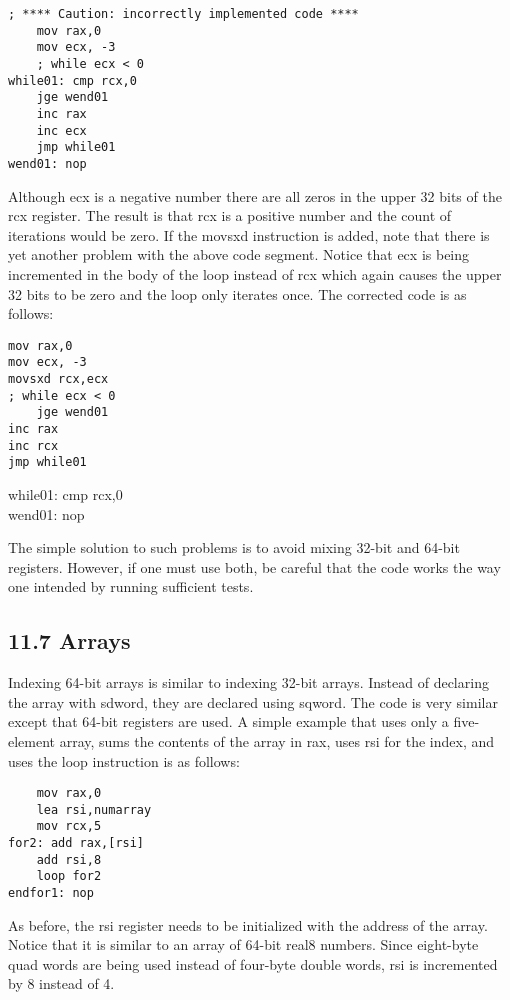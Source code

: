 \documentclass[10pt]{article}
\begin{document}
\begin{verbatim}
; **** Caution: incorrectly implemented code ****
    mov rax,0
    mov ecx, -3
    ; while ecx < 0
while01: cmp rcx,0
    jge wend01
    inc rax
    inc ecx
    jmp while01
wend01: nop
\end{verbatim}

Although ecx is a negative number there are all zeros in the upper 32 bits of the rcx register. The result is that rcx is a positive number and the count of iterations would be zero. If the movsxd instruction is added, note that there is yet another problem with the above code segment. Notice that ecx is being incremented in the body of the loop instead of rcx which again causes the upper 32 bits to be zero and the loop only iterates once. The corrected code is as follows:

\begin{verbatim}
mov rax,0
mov ecx, -3
movsxd rcx,ecx
; while ecx < 0
    jge wend01
inc rax
inc rcx
jmp while01
\end{verbatim}

while01: cmp rcx,0\\
wend01: nop

The simple solution to such problems is to avoid mixing 32-bit and 64-bit registers. However, if one must use both, be careful that the code works the way one intended by running sufficient tests.

\subsection*{11.7 Arrays}
Indexing 64-bit arrays is similar to indexing 32-bit arrays. Instead of declaring the array with sdword, they are declared using sqword. The code is very similar except that 64-bit registers are used. A simple example that uses only a five-element array, sums the contents of the array in rax, uses rsi for the index, and uses the loop instruction is as follows:

\begin{verbatim}
    mov rax,0
    lea rsi,numarray
    mov rcx,5
for2: add rax,[rsi]
    add rsi,8
    loop for2
endfor1: nop
\end{verbatim}

As before, the rsi register needs to be initialized with the address of the array. Notice that it is similar to an array of 64-bit real8 numbers. Since eight-byte quad words are being used instead of four-byte double words, rsi is incremented by 8 instead of 4.
\end{document}
